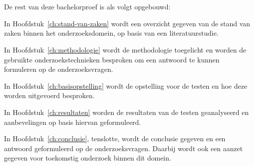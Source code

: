 \section{}%
\label{sec:opzet-bachelorproef}



De rest van deze bachelorproef is als volgt opgebouwd:

In Hoofdstuk~\ref{ch:stand-van-zaken} wordt een overzicht gegeven van de stand van zaken binnen het onderzoeksdomein, op basis van een literatuurstudie.

In Hoofdstuk~\ref{ch:methodologie} wordt de methodologie toegelicht en worden de gebruikte onderzoekstechnieken besproken om een antwoord te kunnen formuleren op de onderzoeksvragen.

In Hoofdstuk~\ref{ch:basisopstelling} wordt de opstelling voor de testen en hoe deze worden uitgevoerd besproken.

In Hoofdstuk~\ref{ch:resultaten} worden de resultaten van de testen geanalyseerd en aanbevelingen op basis hiervan geformuleerd.

In Hoofdstuk~\ref{ch:conclusie}, tenslotte, wordt de conclusie gegeven en een antwoord geformuleerd op de onderzoeksvragen. Daarbij wordt ook een aanzet gegeven voor toekomstig onderzoek binnen dit domein.